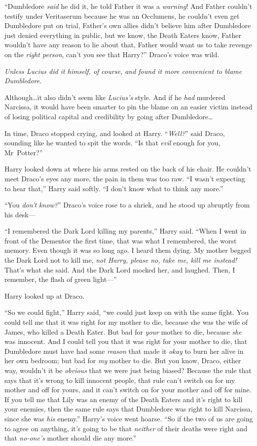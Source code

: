 “Dumbledore \emph{said} he did it, he told Father it was a \emph{warning}! And Father couldn’t testify under Veritaserum because he was an Occlumens, he couldn’t even get Dumbledore put on trial, Father’s own allies didn’t believe him after Dumbledore just denied everything in public, but we know, the Death Eaters know, Father wouldn’t have any reason to lie about that, Father would want us to take revenge on the \emph{right person}, can’t you see that Harry?” Draco’s voice was wild.

\emph{Unless Lucius did it himself, of course, and found it more convenient to blame Dumbledore.}

Although…it also didn’t seem like \emph{Lucius’s} style. And if he \emph{had} murdered Narcissa, it would have been smarter to pin the blame on an easier victim instead of losing political capital and credibility by going after Dumbledore…

In time, Draco stopped crying, and looked at Harry. “\emph{Well?}” said Draco, sounding like he wanted to spit the words. “Is that \emph{evil} enough for you, Mr~Potter?”

Harry looked down at where his arms rested on the back of his chair. He couldn’t meet Draco’s eyes any more, the pain in them was too raw. “I wasn’t expecting to hear that,” Harry said softly. “I don’t know what to think any more.”

“You \emph{don’t know?}” Draco’s voice rose to a shriek, and he stood up abruptly from his desk—

“I remembered the Dark Lord killing my parents,” Harry said. “When I went in front of the Dementor the first time, that was what I remembered, the worst memory. Even though it was so long ago. I heard them dying. My mother begged the Dark Lord not to kill me, \emph{not Harry, please no, take me, kill me instead!} That’s what she said. And the Dark Lord mocked her, and laughed. Then, I remember, the flash of green light—”

Harry looked up at Draco.

“So we could fight,” Harry said, “we could just keep on with the same fight. You could tell me that it was right for my mother to die, because she was the wife of James, who killed a Death Eater. But bad for \emph{your} mother to die, because \emph{she} was innocent. And I could tell you that it was right for your mother to die, that Dumbledore must have had some \emph{reason} that made it \emph{okay} to burn her alive in her own bedroom; but bad for \emph{my} mother to die. But you know, Draco, either way, wouldn’t it be \emph{obvious} that we were just being biased? Because the rule that says that it’s wrong to kill innocent people, that rule can’t switch on for my mother and off for yours, and it can’t switch on for your mother and off for mine. If you tell me that Lily was an enemy of the Death Eaters and it’s right to kill your enemies, then the same rule says that Dumbledore was right to kill Narcissa, since she was \emph{his} enemy.” Harry’s voice went hoarse. “So if the two of us are going to agree on anything, it’s going to be that \emph{neither} of their deaths were right and that \emph{no-one’s} mother should die any more.”

